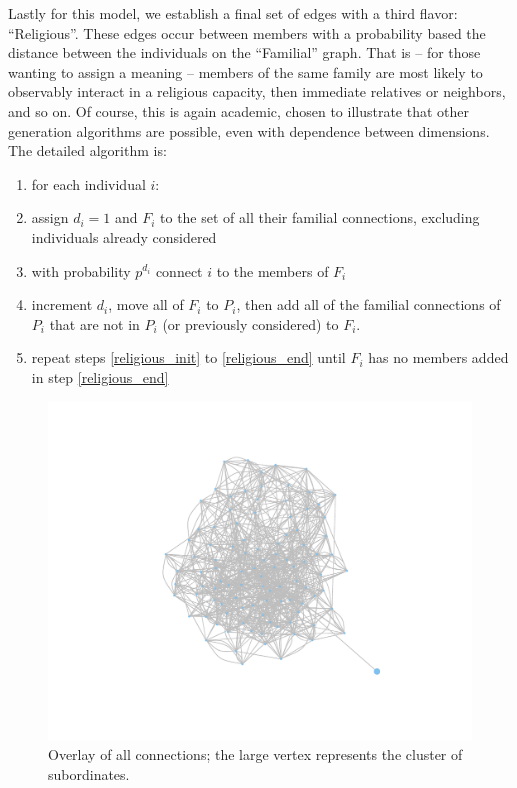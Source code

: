 \documentclass{article}
\newenvironment{rnwfig}[0]{\begin{figure}\begin{center}}{\end{center}\end{figure}}
\begin{document}
Lastly for this model, we establish a final set of edges with a third flavor: ``Religious''.  These edges occur between members with a probability based the distance between the individuals on the ``Familial'' graph.  That is -- for those wanting to assign a meaning -- members of the same family are most likely to observably interact in a religious capacity, then immediate relatives or neighbors, and so on.  Of course, this is again academic, chosen to illustrate that other generation algorithms are possible, even with dependence between dimensions.  The detailed algorithm is:\begin{enumerate}
\item\label{religious_init} for each individual $i$:
\item assign $d_i=1$ and $F_i$ to the set of all their familial connections, excluding individuals already considered
\item with probability $p^{d_i}$ connect $i$ to the members of $F_i$
\item\label{religious_end} increment $d_i$, move all of $F_i$ to $P_i$, then add all of the familial connections of $P_i$ that are not in $P_i$ (or previously considered) to $F_i$.
\item repeat steps \ref{religious_init} to \ref{religious_end} until $F_i$ has no members added in step \ref{religious_end} 
\end{enumerate}


\begin{rnwfig}
\includegraphics{manuscript-all}
\caption{Overlay of all connections; the large vertex represents the cluster of subordinates.}
\end{rnwfig}
\end{document}
